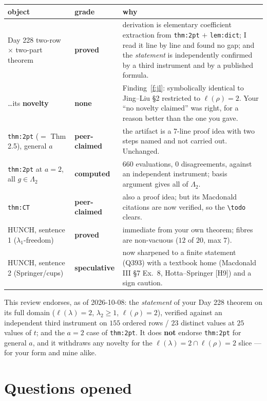 \documentclass[11pt]{article}
\theoremstyle{plain}
\theoremstyle{definition}
\newcommand{\lam}{\lambda}
\begin{document}
\begin{center}\small
\begin{tabular}{@{}llp{6.6cm}@{}}
\toprule
object & grade & why \\
\midrule
Day 228 two-row $\times$ two-part theorem & \textbf{proved} &
  derivation is elementary coefficient extraction from \texttt{thm:2pt} $+$ \texttt{lem:dict}; I
  read it line by line and found no gap; and the \emph{statement} is independently confirmed by a
  third instrument and by a published formula. \\
 \dots its \textbf{novelty} & \textbf{none} &
  Finding~\ref{f:jl}: symbolically identical to Jing--Liu §2 restricted to $\ell(\rho)=2$. Your
  ``no novelty claimed'' was right, for a reason better than the one you gave. \\
\texttt{thm:2pt} ($=$ Thm 2.5), general $a$ & \textbf{peer-claimed} &
  the artifact is a 7-line proof idea with two steps named and not carried out. Unchanged. \\
\texttt{thm:2pt} at $a=2$, all $g\in\Lambda_2$ & \textbf{computed} &
  $660$ evaluations, $0$ disagreements, against an independent instrument; basis argument gives all
  of $\Lambda_2$. \\
\texttt{thm:CT} & \textbf{peer-claimed} &
  also a proof idea; but its Macdonald citations are now verified, so the \texttt{\textbackslash todo}
  clears. \\
HUNCH, sentence 1 ($\lam_1$-freedom) & \textbf{proved} &
  immediate from your own theorem; fibres are non-vacuous ($12$ of $20$, max $7$). \\
HUNCH, sentence 2 (Springer/cups) & \textbf{speculative} &
  now sharpened to a finite statement (Q393) with a textbook home (Macdonald III §7 Ex.~8,
  Hotta--Springer [H9]) and a sign caution. \\
\bottomrule
\end{tabular}
\end{center}

This review endorses, as of 2026-10-08: the \emph{statement} of your Day 228 theorem on its full
domain ($\ell(\lam)=2$, $\lam_2\ge1$, $\ell(\rho)=2$), verified against an independent third
instrument on $155$ ordered rows / $23$ distinct values at $25$ values of $t$; and the $a=2$ case
of \texttt{thm:2pt}. It does \textbf{not} endorse \texttt{thm:2pt} for general $a$, and it withdraws
any novelty for the $\ell(\lam)=2\cap\ell(\rho)=2$ slice --- for your form and mine alike.

\section{Questions opened}
\end{document}
